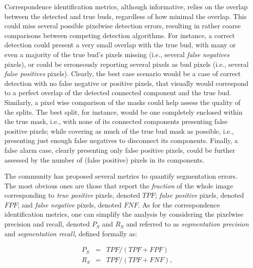 \documentclass[a4paper,authoryear,review]{elsarticle}
\begin{document}
Correspondence identification metrics, although informative, relies on  the overlap between the detected and true buds, regardless of how minimal the overlap. This could miss several possible pixelwise detection errors, resulting in rather coarse comparisons between competing detection algorithms. For instance, a correct detection could present a very small overlap with the true bud, with many or even a majority of the true bud’s pixels missing (i.e., several \emph{false negatives} pixels), or could be erroneously reporting several pixels as bud pixels (i.e., several \emph{false positives} pixels). Clearly, the best case scenario would be a case of correct detection with no false negative or positive pixels, that visually would correspond to a perfect overlap of the detected connected component and the true bud.  Similarly, a pixel wise comparison of the masks could help assess the quality of the splits. The best split, for instance, would be one completely enclosed within the true mask, i.e., with none of its connected components presenting false positive pixels; while covering as much of the true bud mask as possible, i.e., presenting just enough false negatives to disconnect its components. 
%
Finally, a false alarm case, clearly presenting only false positive pixels, could be further assessed by the number of (false positive) pixels in its components. 

The community has proposed several metrics to quantify segmentation errors. The most obvious ones are those that 
report the \emph{fraction} of the whole image corresponding to \emph{true positive} pixels, denoted $TPF$; \emph{false positive} pixels,  denoted $FPF$;  and \emph{false negative} pixels, denoted $FNF$. 
%
As for the correspondence identification metrics, one can simplify the analysis by considering the  pixelwise precision and recall, denoted $P_S$ and $R_S$ and referred to as \emph{segmentation precision}  and \emph{segmentation recall}, defined formally as: 

\begin{eqnarray*} 
    P_S &=& TPF / (TPF + FPF) \\
    R_S &=& TPF / (TPF + FNF),
\end{eqnarray*}
\end{document}
